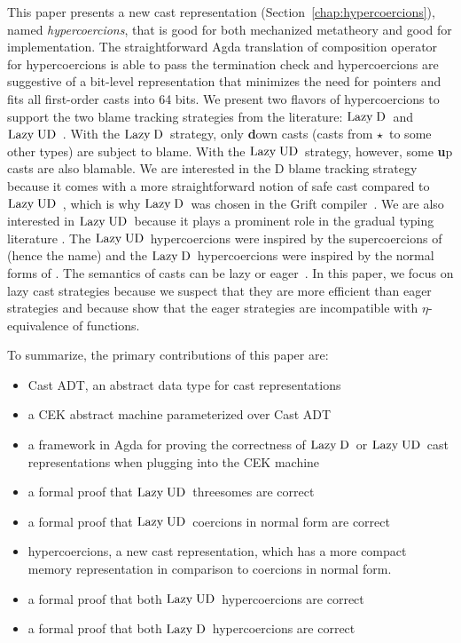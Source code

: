 \documentclass[runningheads]{llncs}
\newcommand{\LUD}{\ensuremath{\text{Lazy\;UD}}}
\newcommand{\LD}{\ensuremath{\text{Lazy\;D}}}
\newcommand{\Tdyn}[0]{\ensuremath{\star}}
\begin{document}
This paper presents a new cast representation 
(Section~\ref{chap:hypercoercions}), named
\emph{hypercoercions}, that is good for both mechanized metatheory and
good for implementation. The straightforward Agda translation of composition 
operator for hypercoercions is able to pass the termination check and 
hypercoercions are suggestive of a bit-level representation that minimizes the 
need for pointers and fits all first-order casts into 64 bits.
%
We present two flavors of hypercoercions to support the two blame
tracking strategies from the literature: \LD\ and
\LUD~\citep{siek2009exploring}. With the \LD\ strategy, only 
\textbf{d}own 
casts (casts from \Tdyn\ to some other types) are subject to blame. 
With the 
\LUD\
strategy, however, some \textbf{u}p casts are also blamable.
We are interested in the D blame
tracking strategy because it comes with a more straightforward notion of
safe cast compared to \LUD~\citep{siek2009exploring}, which is why \LD\ 
was
chosen in the Grift compiler~\citep{kuhlenschmidt2018efficient}. We are also 
interested in \LUD\ because it plays a
prominent role in the gradual typing literature
\citep{wadler2009well}.  The \LUD\ hypercoercions were inspired by the
supercoercions of \citep{Garcia:2013:CTB:2500365.2500603} (hence the name) and
the \LD\ hypercoercions were inspired by the normal forms of
\citep{siek2012interpretations}.
The semantics of casts can be lazy or
eager~\citep{siek2009exploring}. In this paper, we focus on lazy cast
strategies because we suspect that they are more efficient than eager
strategies and because \citet{new2019gradual} show that the eager
strategies are incompatible with $\eta$-equivalence of functions.

To summarize, the primary contributions of this paper are:
\begin{itemize}
    \item Cast ADT, an abstract data type for cast representations
    \item a CEK abstract machine parameterized over Cast ADT
	\item a framework in Agda for proving the correctness of \LD\ or \LUD\ 
	cast representations when plugging into the CEK machine
	\item a formal proof that \LUD\ threesomes are correct
	\item a formal proof that \LUD\ coercions in normal form are correct
	\item hypercoercions, a new cast representation, which
	has a more compact memory representation in comparison to coercions in 
	normal form.
	\item a formal proof that both \LUD\ hypercoercions are correct
	\item a formal proof that both \LD\ hypercoercions are correct
\end{itemize}
\end{document}
